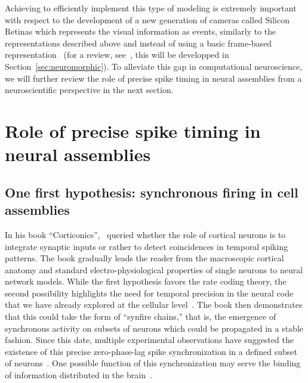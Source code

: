 \documentclass[brainsci, %
               review,submit,pdftex,moreauthors
               ]{Definitions/mdpi}
\begin{document}
Achieving to efficiently implement this type of modeling is extremely important with respect to the development of a new generation of cameras called Silicon Retinas which represents the visual information as events, similarly to the representations described above and instead of using a basic frame-based representation~\citep{lichtsteiner_128-128_2008} (for a review, see~\citep{rasetto_challenges_2022}, this will be developped in Section~\ref{sec:neuromorphic}). %
To alleviate this gap in computational neuroscience, we will further review the role of  precise spike timing in neural assemblies from a neuroscientific perspective in the next section.
%
\section{Role of precise spike timing in neural assemblies}
\subsection{One first hypothesis: synchronous firing in cell assemblies}
%
In his book ``Corticonics'',~\citet{abeles_corticonics_1991} queried whether the role of cortical neurons is to integrate synaptic inputs or rather to detect coincidences in temporal spiking patterns. The book gradually leads the reader from the macroscopic cortical anatomy and standard electro-physiological properties of single neurons to neural network models. While the first hypothesis favors the rate coding theory, the second possibility highlights the need for temporal precision in the neural code that we have already explored at the cellular level~\citep{abeles_role_1982,paugam-moisy_computing_2012}. The book then demonstrates that this could take the form of ``synfire chains,'' that is, the emergence of synchronous activity on subsets of neurons which could be propagated in a stable fashion. Since this date, multiple experimental observations have suggested the existence of this precise zero-phase-lag spike synchronization in a defined subset of neurons~\citep{harris_organization_2003}. One possible function of this synchronization may serve the binding of information distributed in the brain~\citep{singer_visual_1995, roelfsema_visuomotor_1997}.
\end{document}
